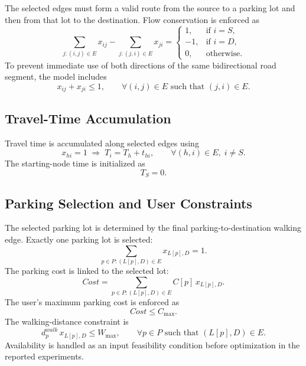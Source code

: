 The selected edges must form a valid route from the source to a parking lot and then from that lot to the destination. Flow conservation is enforced as
\begin{equation}
\sum_{j:(i,j)\in E} x_{ij} - \sum_{j:(j,i)\in E} x_{ji} =
\begin{cases}
1, & \text{if } i = S,\\
-1, & \text{if } i = D,\\
0, & \text{otherwise}.
\end{cases}
\label{eq:flow_conservation}
\end{equation}
To prevent immediate use of both directions of the same bidirectional road segment, the model includes
\begin{equation}
x_{ij} + x_{ji} \leq 1, \qquad \forall (i,j)\in E \text{ such that } (j,i)\in E.
\label{eq:bidirectional_constraint}
\end{equation}

\subsection{Travel-Time Accumulation}

Travel time is accumulated along selected edges using
\begin{equation}
x_{hi}=1 \;\Rightarrow\; T_i = T_h + t_{hi}, \qquad \forall (h,i)\in E,\; i\neq S.
\label{eq:time_accumulation}
\end{equation}
The starting-node time is initialized as
\begin{equation}
T_S = 0.
\label{eq:source_time}
\end{equation}

\subsection{Parking Selection and User Constraints}

The selected parking lot is determined by the final parking-to-destination walking edge. Exactly one parking lot is selected:
\begin{equation}
\sum_{p\in P:(L[p],D)\in E} x_{L[p],D} = 1.
\label{eq:parking_selection}
\end{equation}
The parking cost is linked to the selected lot:
\begin{equation}
Cost = \sum_{p\in P:(L[p],D)\in E} C[p]\,x_{L[p],D}.
\label{eq:parking_cost_link}
\end{equation}
The user's maximum parking cost is enforced as
\begin{equation}
Cost \leq C_{\max}.
\label{eq:parking_cost_cap}
\end{equation}
The walking-distance constraint is
\begin{equation}
d^{walk}_{p}\,x_{L[p],D} \leq W_{\max}, \qquad \forall p\in P \text{ such that } (L[p],D)\in E.
\label{eq:walking_distance_constraint}
\end{equation}
Availability is handled as an input feasibility condition before optimization in the reported experiments.

